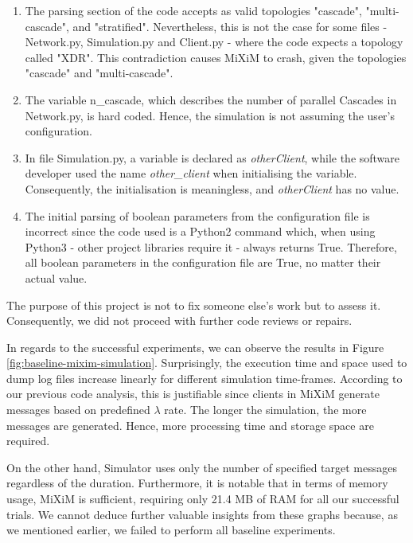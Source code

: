 \documentclass[logo,msc,cyber]{infthesis}   %
\begin{document}
\begin{enumerate}
    \item The parsing section of the code accepts as valid topologies "cascade",
    "multi-cascade", and "stratified". Nevertheless, this is not the case for
    some files - Network.py, Simulation.py and Client.py - where the code
    expects a topology called "XDR". This contradiction causes MiXiM to crash,
    given the topologies "cascade" and "multi-cascade". 
    \item The variable n\_cascade, which describes the number of parallel
    Cascades in Network.py, is hard coded. Hence, the simulation is not assuming
    the user's configuration.
    \item In file Simulation.py, a variable is declared as \emph{otherClient}, while
    the software developer used the name \emph{other\_client} when initialising the
    variable. Consequently, the initialisation is meaningless, and \emph{otherClient}
    has no value.
    \item The initial parsing of boolean parameters from the configuration file
    is incorrect since the code used is a Python2 command which, when using
    Python3 - other project libraries require it - always returns True.
    Therefore, all boolean parameters in the configuration file are True, no
    matter their actual value.
\end{enumerate}

The purpose of this project is not to fix someone else's work but to assess
it. Consequently, we did not proceed with further code reviews or repairs.

In regards to the successful experiments, we can observe the results in Figure
\ref{fig:baseline-mixim-simulation}. Surprisingly, the execution time and space
used to dump log files increase linearly for different simulation time-frames.
According to our previous code analysis, this is justifiable since clients in
MiXiM generate messages based on predefined $\lambda$ rate. The longer the
simulation, the more messages are generated. Hence, more processing time and
storage space are required.

On the other hand, Simulator uses only the number of specified target messages
regardless of the duration. Furthermore, it is notable that in terms of memory
usage, MiXiM is sufficient, requiring only 21.4 MB of RAM for all our
successful trials. We cannot deduce further valuable insights from these
graphs because, as we mentioned earlier, we failed to perform all baseline
experiments.
\end{document}
